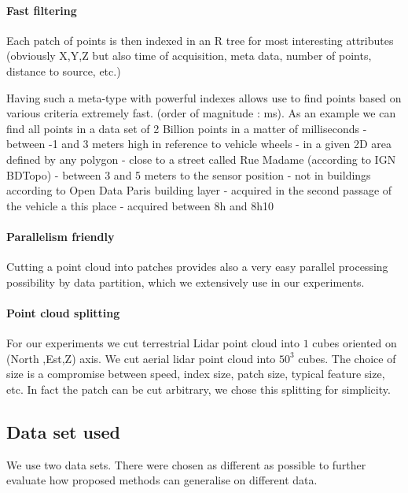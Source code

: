 			\paragraph{Fast filtering}
				Each patch of points is then indexed in an R tree for most interesting attributes (obviously X,Y,Z but also time of acquisition, meta data, number of points, distance to source, etc.)
				
				Having such a meta-type with powerful indexes allows use to find points based on various criteria extremely fast. (order of magnitude : ms). 
				As an example we can find all points in a data set of 2 Billion points in a matter of milliseconds 
				 - between -1 and 3 meters high in reference to vehicle wheels
				 - in a given 2D area defined by any polygon
				 - close to a street called Rue Madame (according to IGN BDTopo)
				 - between 3 and 5 meters to the sensor position 
				 - not in buildings according to Open Data Paris building layer 
				 - acquired in the second passage of the vehicle a this place
				 - acquired between 8h and 8h10
		 
		    \paragraph{Parallelism friendly}
				Cutting a point cloud into patches provides also a very easy parallel processing possibility by data partition, which we extensively use in our experiments.
		
			\paragraph{Point cloud splitting}
				For our experiments we cut terrestrial Lidar point cloud into $1$ \cubic \meter cubes oriented on (North ,Est,Z) axis.
				We cut aerial lidar point cloud into $50^3$ \cubic \meter cubes.
				The choice of size is a compromise between speed, index size, patch size, typical feature size, etc.
				In fact the patch can be cut arbitrary, we chose this splitting for simplicity.
		
	\subsection{Data set used}
		We use two data sets. There were chosen as different as possible to further evaluate how proposed methods can generalise on different data.
		
		
